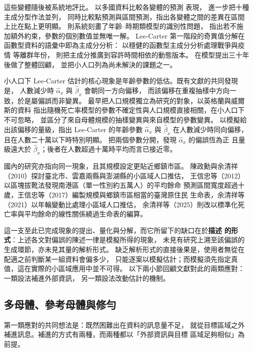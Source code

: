 \documentclass[UTF8, fontset=macnew, a4paper, 12pt]{ctexart}
\begin{document}
這些變體隨後被系統地評比。\citet{booth2006} 以多國資料比較各變體的預測
表現，\citet{shang2011} 進一步把十種主成分型作法並列，
同時比較點預測與區間預測，指出各變體之間的差異在區間上比在點上更明顯。
\citet{hunt2020} 則系統刻畫了年齡--時期類模型的識別性問題，
指出若不施加額外約束，參數的個別數值並無唯一解。
Lee-Carter 第一階段的奇異值分解在函數型資料的語彙中即為主成分分析：\citet{hyndman2007} 以穩健的函數型主成分分析處理戰爭與疫情
等離群年份，\citet{hormann2015} 則把主成分推廣到容許時間相依的動態版本。
\citet{basellini2023} 在模型提出三十年後做了整體回顧，
並把小人口列為尚未解決的課題之一。

小人口下 Lee-Carter 估計的核心現象是年齡參數的低估。既有文獻的共同發現是，
人數減少時 $\hat\alpha_x$ 與 $\hat\beta_x$ 會朝同一方向偏移，
而該偏移在重複抽樣中方向一致，於是屬偏誤而非變異。
\citet{chen2017} 最早把人口規模獨立為研究的對象，以英格蘭與威爾斯的資料
指出隨機死亡率模型的參數不確定性與人口規模直接相關，在小人口下不可忽略，
並區分了來自母體規模的抽樣變異與來自模型的參數變異。
\citet{wang2018} 以模擬給出該偏移的量級，指出 Lee-Carter 的年齡參數
$\hat\alpha_x$ 與 $\hat\beta_x$ 在人數減少時同向偏移，
且在人數二十萬以下時特別明顯。
\citet[Figure 1]{yue2019} 把兩個參數分開，發現 $\hat\alpha_x$ 的偏誤恆為正
且量級遠大於 $\hat\beta_x$；後者在人數超過十萬時平均而言已接近零。

國內的研究亦指向同一現象，且其規模設定更貼近鄉鎮市區。
陳政勳與余清祥（2010）探討臺北市、雲嘉兩縣與澎湖縣的小區域人口推估，
王信忠等（2012）以區塊拔靴法發現南港區（單一性別約五萬人）的平均餘命
預測區間寬度超過十歲，王信忠等（2017）編製規模與鄉鎮市區相當的臺灣原住民
生命表，余清祥等（2021）以年輪變動比處理小區域人口推估，
余清祥等（2025）則改以標準化死亡率與平均餘命的線性關係繞過生命表的編算。

這一支至此已完成現象的提出、量化與分解，而它所留下的缺口在於\textbf{描述
的形式}：上述各文對偏誤的陳述一律是模擬所得的現象，
未見有研究上溯至該偏誤的生成環節，亦未見其量的解析形式。
缺乏解析形式的直接後果是，使用者無從在配適之前判斷某一組資料會偏多少，
只能逐案以模擬估計；而模擬須先指定真值，這在實際的小區域應用中並不可得。
以下兩小節回顧文獻對此的兩類應對：一類設法補進外部資訊，
另一類設法改動估計的機制。

\subsection{多母體、參考母體與修勻}\label{sec:ref}

第一類應對的共同想法是：既然困難出在資料的訊息量不足，
就從目標區域之外補進訊息。補進的方式有兩種，而兩種都以「外部資訊與目標
區域足夠相似」為前提。
\end{document}
